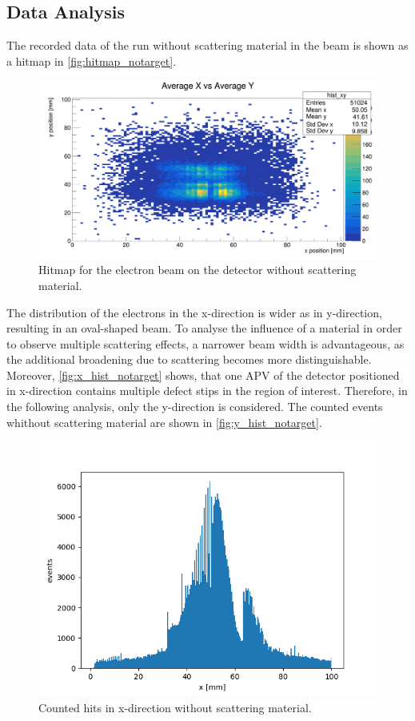 \documentclass[sn-mathphys-num,iicol]{sn-jnl}
\theoremstyle{thmstyleone}
\theoremstyle{thmstyletwo}
\theoremstyle{thmstylethree}
\begin{document}
\subsection{Data Analysis}
The recorded data of the run without scattering material in the beam is shown as a hitmap in \autoref{fig:hitmap_notarget}. 
\begin{figure}
  \includegraphics[width=0.9\linewidth]{../src/elsa/finished_plots/xy_hitmap_0.png}
  \caption{Hitmap for the electron beam on the detector without scattering material.}
  \label{fig:hitmap_notarget}
\end{figure}
The distribution of the electrons in the x-direction is wider as in y-direction, resulting in an oval-shaped beam.
To analyse the influence of a material in order to observe multiple scattering effects, a narrower beam width is advantageous, as the additional broadening due to scattering becomes more distinguishable.
Moreover, \autoref{fig:x_hist_notarget} shows, that one APV of the detector positioned in x-direction contains multiple defect stips in the region of interest.
Therefore, in the following analysis, only the y-direction is considered. The counted events whithout scattering material are shown in \autoref{fig:y_hist_notarget}.

\begin{figure}
  \includegraphics[width=0.9\linewidth]{../src/elsa/finished_plots/UnfilteredNoMaterialX.png}
  \caption{Counted hits in x-direction without scattering material.}
  \label{fig:x_hist_notarget}
\end{figure}
\end{document}
